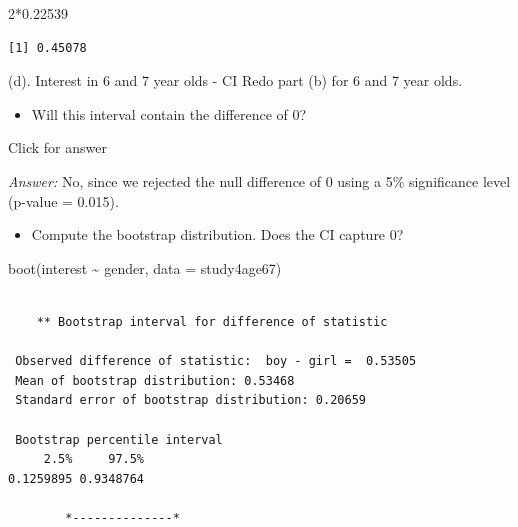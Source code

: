 \documentclass[
]{book}
\newenvironment{Shaded}{\begin{snugshade}}{\end{snugshade}}
\newcommand{\AttributeTok}[1]{\textcolor[rgb]{0.77,0.63,0.00}{#1}}
\newcommand{\DecValTok}[1]{\textcolor[rgb]{0.00,0.00,0.81}{#1}}
\newcommand{\FloatTok}[1]{\textcolor[rgb]{0.00,0.00,0.81}{#1}}
\newcommand{\FunctionTok}[1]{\textcolor[rgb]{0.00,0.00,0.00}{#1}}
\newcommand{\NormalTok}[1]{#1}
\newcommand{\SpecialCharTok}[1]{\textcolor[rgb]{0.00,0.00,0.00}{#1}}
\providecommand{\tightlist}{%
  \setlength{\itemsep}{0pt}\setlength{\parskip}{0pt}}
\begin{document}
\begin{Shaded}
\begin{Highlighting}[]
\DecValTok{2}\SpecialCharTok{*}\FloatTok{0.22539} 
\end{Highlighting}
\end{Shaded}

\begin{verbatim}
[1] 0.45078
\end{verbatim}

\vspace*{.5in}

(d). Interest in 6 and 7 year olds - CI
Redo part (b) for 6 and 7 year olds.

\begin{itemize}
\tightlist
\item
  Will this interval contain the difference of 0?
\end{itemize}

Click for answer

\emph{Answer:} No, since we rejected the null difference of 0 using a 5\% significance level (p-value = 0.015).

\vspace*{.5in}

\begin{itemize}
\tightlist
\item
  Compute the bootstrap distribution. Does the CI capture 0?
\end{itemize}

\begin{Shaded}
\begin{Highlighting}[]
\FunctionTok{boot}\NormalTok{(interest }\SpecialCharTok{\textasciitilde{}}\NormalTok{ gender, }\AttributeTok{data =}\NormalTok{ study4age67)}
\end{Highlighting}
\end{Shaded}

\begin{verbatim}

    ** Bootstrap interval for difference of statistic

 Observed difference of statistic:  boy - girl =  0.53505 
 Mean of bootstrap distribution: 0.53468 
 Standard error of bootstrap distribution: 0.20659 

 Bootstrap percentile interval
     2.5%     97.5% 
0.1259895 0.9348764 

        *--------------*
\end{verbatim}
\end{document}
